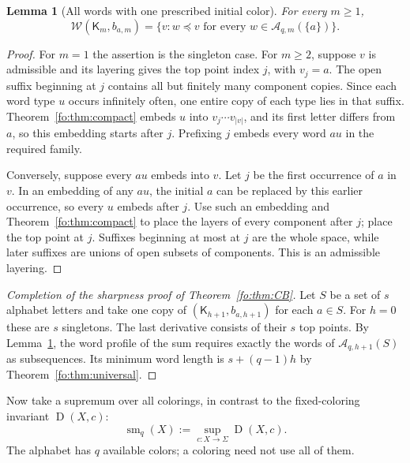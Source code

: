 \documentclass[11pt,letterpaper]{article}
\numberwithin{equation}{section}
\newtheorem{lemma}[lemma]{Lemma}
\theoremstyle{definition}
\theoremstyle{remark}
\theoremstyle{definition}
\newcommand{\W}{\mathcal W}
\newcommand{\A}{\mathcal A}
\newcommand{\depth}{\operatorname{D}}
\newcommand{\smq}{\operatorname{sm}_{q}}
\newcommand{\len}[1]{\lvert #1\rvert}
\newcommand{\subseq}{\preccurlyeq}
\newcommand{\Tw}{\mathsf K}
\begin{document}
\begin{lemma}[All words with one prescribed initial color]\label{fo:lem:root-profile}
For every $m\ge1$,
\[
 \W(\Tw_m,b_{a,m})
 =\{v:w\subseq v\text{ for every }w\in\A_{q,m}(\{a\})\}.
\]
\end{lemma}
\begin{proof}
For $m=1$ the assertion is the singleton case. For $m\ge2$, suppose $v$ is
admissible and its layering gives the top point index $j$, with $v_j=a$.
The open suffix beginning at $j$ contains all but finitely many component
copies. Since each word type $u$ occurs infinitely often, one entire copy of
each type lies in that suffix. Theorem~\ref{fo:thm:compact} embeds $u$ into
$v_j\cdots v_{\len{v}}$, and its first letter differs from $a$, so this embedding
starts after $j$. Prefixing $j$ embeds every word $au$ in the required family.

Conversely, suppose every $au$ embeds into $v$. Let $j$ be the first occurrence
of $a$ in $v$. In an embedding of any $au$, the initial $a$ can be replaced by
this earlier occurrence, so every $u$ embeds after $j$. Use such an embedding
and Theorem~\ref{fo:thm:compact} to place the layers of every component after $j$;
place the top point at $j$. Suffixes beginning at most at $j$ are the whole
space, while later suffixes are unions of open subsets of components. This is
an admissible layering.
\end{proof}

\begin{proof}[Completion of the sharpness proof of Theorem~\ref{fo:thm:CB}]
Let $S$ be a set of $s$ alphabet letters and take one copy of
$(\Tw_{h+1},b_{a,h+1})$ for each $a\in S$. For $h=0$ these are $s$ singletons.
The last derivative consists of their $s$ top points. By
Lemma~\ref{fo:lem:root-profile}, the word profile of the sum requires exactly the
words of $\A_{q,h+1}(S)$ as subsequences. Its minimum word length is
$s+(q-1)h$ by Theorem~\ref{fo:thm:universal}.
\end{proof}

Now take a supremum over all colorings, in contrast to the fixed-coloring
invariant $\depth(X,c)$:
\[
 \smq(X):=\sup_{c:X\to\Sigma}\depth(X,c).
\]
The alphabet has $q$ available colors; a coloring need not use all of them.
\end{document}
